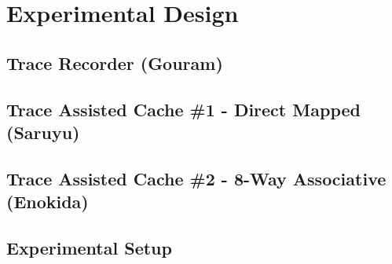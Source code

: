 \chapter{Experimental Design}

\section{Trace Recorder (Gouram)}

\section{Trace Assisted Cache \#1 - Direct Mapped (Saruyu)}

\section{Trace Assisted Cache \#2 - 8-Way Associative (Enokida)}

\section{Experimental Setup}

